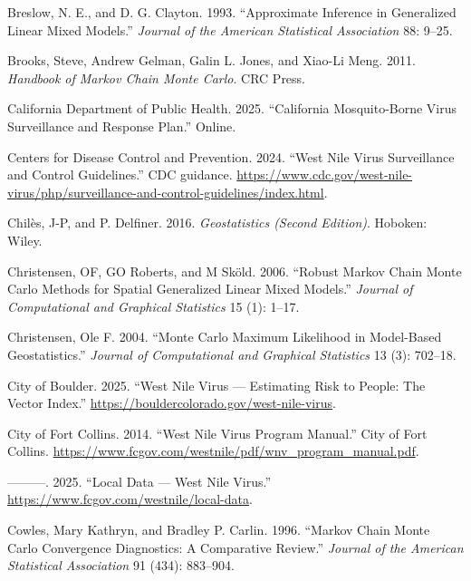 \documentclass[
  letterpaper,
]{krantz}
\newlength{\cslhangindent}
\newenvironment{CSLReferences}[2] %
 {\begin{list}{}{%
  \setlength{\itemindent}{0pt}
  \setlength{\leftmargin}{0pt}
  \setlength{\parsep}{0pt}
  \ifodd #1
   \setlength{\leftmargin}{\cslhangindent}
   \setlength{\itemindent}{-1\cslhangindent}
  \fi
  \setlength{\itemsep}{#2\baselineskip}}}
 {\end{list}}
\begin{document}
\begin{CSLReferences}{1}{0}
Breslow, N. E., and D. G. Clayton. 1993. {``Approximate Inference in
Generalized Linear Mixed Models.''} \emph{Journal of the American
Statistical Association} 88: 9--25.

Brooks, Steve, Andrew Gelman, Galin L. Jones, and Xiao-Li Meng. 2011.
\emph{Handbook of Markov Chain Monte Carlo}. CRC Press.

California Department of Public Health. 2025. {``California
Mosquito-Borne Virus Surveillance and Response Plan.''} Online.

Centers for Disease Control and Prevention. 2024. {``West Nile Virus
Surveillance and Control Guidelines.''} CDC guidance.
\url{https://www.cdc.gov/west-nile-virus/php/surveillance-and-control-guidelines/index.html}.

Chilès, J-P, and P. Delfiner. 2016. \emph{Geostatistics (Second
Edition)}. Hoboken: Wiley.

Christensen, OF, GO Roberts, and M Sköld. 2006. {``Robust Markov Chain
Monte Carlo Methods for Spatial Generalized Linear Mixed Models.''}
\emph{Journal of Computational and Graphical Statistics} 15 (1): 1--17.

Christensen, Ole F. 2004. {``Monte Carlo Maximum Likelihood in
Model-Based Geostatistics.''} \emph{Journal of Computational and
Graphical Statistics} 13 (3): 702--18.

City of Boulder. 2025. {``West Nile Virus --- Estimating Risk to People:
The Vector Index.''} \url{https://bouldercolorado.gov/west-nile-virus}.

City of Fort Collins. 2014. {``West Nile Virus Program Manual.''} City
of Fort Collins.
\url{https://www.fcgov.com/westnile/pdf/wnv_program_manual.pdf}.

---------. 2025. {``Local Data --- West Nile Virus.''}
\url{https://www.fcgov.com/westnile/local-data}.

Cowles, Mary Kathryn, and Bradley P. Carlin. 1996. {``Markov Chain Monte
Carlo Convergence Diagnostics: A Comparative Review.''} \emph{Journal of
the American Statistical Association} 91 (434): 883--904.


\end{CSLReferences}
\end{document}
